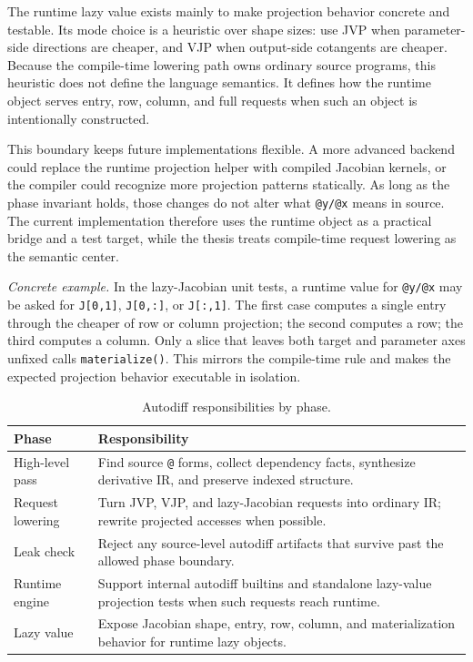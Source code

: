 The runtime lazy value exists mainly to make projection behavior concrete and
testable. Its mode choice is a heuristic over shape sizes: use JVP when
parameter-side directions are cheaper, and VJP when output-side cotangents are
cheaper. Because the compile-time lowering path owns ordinary source programs,
this heuristic does not define the language semantics. It defines how the
runtime object serves entry, row, column, and full requests when such an object
is intentionally constructed.

This boundary keeps future implementations flexible. A more advanced backend
could replace the runtime projection helper with compiled Jacobian kernels, or
the compiler could recognize more projection patterns statically. As long as the
phase invariant holds, those changes do not alter what \texttt{@y/@x} means in
source. The current implementation therefore uses the runtime object as a
practical bridge and a test target, while the thesis treats compile-time request
lowering as the semantic center.

\textit{Concrete example.} In the lazy-Jacobian unit tests, a runtime value for
\texttt{@y/@x} may be asked for \texttt{J[0,1]}, \texttt{J[0,:]}, or
\texttt{J[:,1]}. The first case computes a single entry through the cheaper of
row or column projection; the second computes a row; the third computes a
column. Only a slice that leaves both target and parameter axes unfixed calls
\texttt{materialize()}. This mirrors the compile-time rule and makes the
expected projection behavior executable in isolation.

\begin{table}[htbp]
\centering
\caption{Autodiff responsibilities by phase.}
\label{tab:autodiff-phases}
\renewcommand{\arraystretch}{1.08}
\begin{tabular}{@{}L{0.26\textwidth}L{0.62\textwidth}@{}}
\toprule
Phase & Responsibility \\
\midrule
High-level pass & Find source \texttt{@} forms, collect dependency facts, synthesize derivative IR, and preserve indexed structure. \\
Request lowering & Turn JVP, VJP, and lazy-Jacobian requests into ordinary IR; rewrite projected accesses when possible. \\
Leak check & Reject any source-level autodiff artifacts that survive past the allowed phase boundary. \\
Runtime engine & Support internal autodiff builtins and standalone lazy-value projection tests when such requests reach runtime. \\
Lazy value & Expose Jacobian shape, entry, row, column, and materialization behavior for runtime lazy objects. \\
\bottomrule
\end{tabular}
\end{table}

